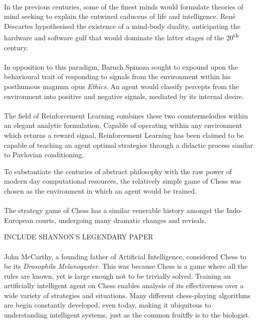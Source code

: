 \documentclass[a4paper]{book}
\begin{document}
\paragraph{} In the previous centuries, some of the finest minds would formulate theories of mind seeking to explain the entwined caduceus of life and intelligence. Ren\'e Descartes hypothesised the existence of a mind-body duality, anticipating the hardware and software gulf that would dominate the latter stages of the 20\textsuperscript{th} century.

\paragraph{} In opposition to this paradigm, Baruch Spinoza sought to expound upon the behavioural trait of responding to signals from the environment within his posthumous magnum opus \textit{Ethics}. An agent would classify percepts from the environment into positive and negative signals, mediated by its internal desire.

\paragraph{} The field of Reinforcement Learning combines these two countermelodies within an elegant analytic formulation. Capable of operating within any environment which returns a reward signal, Reinforcement Learning has been claimed to be capable of teaching an agent optimal strategies through a didactic process similar to Pavlovian conditioning.


To substantiate the centuries of abstract philosophy with the raw power of modern day computational resources, the relatively simple game of Chess was chosen as the environment in which an agent would be trained.

\paragraph{} 


\paragraph{} The strategy game of Chess has a similar venerable history amongst the Indo-European courts, undergoing many dramatic changes and revisals.

INCLUDE SHANNON'S LEGENDARY PAPER


\paragraph{}John McCarthy, a founding father of Artificial Intelligence, considered Chess to be its \textit{Drosophila Melanogaster}. \cite{drosophila} This was because Chess is a game where all the rules are known, yet is large enough not to be trivially solved. Training an artificially intelligent agent on Chess enables analysis of its effectiveness over a wide variety of strategies and situations. Many different chess-playing algorithms are begin constantly developed, even today, making it ubiquitous to understanding intelligent systems, just as the common fruitfly is to the biologist.
\end{document}
